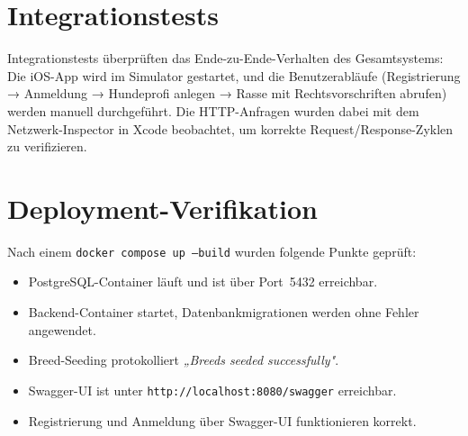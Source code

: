 \section{Integrationstests}
\label{sec:integrationstests}

Integrationstests überprüften das Ende-zu-Ende-Verhalten des Gesamtsystems: Die iOS-App
wird im Simulator gestartet, und die Benutzerabläufe (Registrierung → Anmeldung →
Hundeprofi anlegen → Rasse mit Rechtsvorschriften abrufen) werden manuell durchgeführt.
Die HTTP-Anfragen wurden dabei mit dem Netzwerk-Inspector in Xcode beobachtet, um
korrekte Request/Response-Zyklen zu verifizieren.

\section{Deployment-Verifikation}
\label{sec:deployment-test}

Nach einem \texttt{docker compose up --build} wurden folgende Punkte geprüft:

\begin{itemize}
  \item PostgreSQL-Container läuft und ist über Port~5432 erreichbar.
  \item Backend-Container startet, Datenbankmigrationen werden ohne Fehler angewendet.
  \item Breed-Seeding protokolliert \textit{„Breeds seeded successfully"}.
  \item Swagger-UI ist unter \texttt{http://localhost:8080/swagger} erreichbar.
  \item Registrierung und Anmeldung über Swagger-UI funktionieren korrekt.
\end{itemize}
